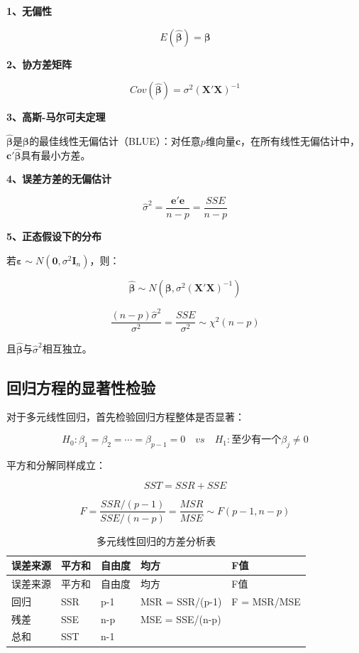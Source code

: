 \documentclass[
]{book}
\begin{document}
\textbf{1、无偏性}

\[
E(\hat{\boldsymbol{\beta}}) = \boldsymbol{\beta}
\]

\textbf{2、协方差矩阵}

\[
Cov(\hat{\boldsymbol{\beta}}) = \sigma^2 (\mathbf{X}'\mathbf{X})^{-1}
\]

\textbf{3、高斯-马尔可夫定理}

\(\hat{\boldsymbol{\beta}}\)是\(\boldsymbol{\beta}\)的最佳线性无偏估计（BLUE）：对任意\(p\)维向量\(\mathbf{c}\)，在所有线性无偏估计中，\(\mathbf{c}'\hat{\boldsymbol{\beta}}\)具有最小方差。

\textbf{4、误差方差的无偏估计}

\[
\hat{\sigma}^2 = \frac{\mathbf{e}'\mathbf{e}}{n-p} = \frac{SSE}{n-p}
\]

\textbf{5、正态假设下的分布}

若\(\boldsymbol{\varepsilon} \sim N(\mathbf{0}, \sigma^2 \mathbf{I}_n)\)，则：

\[
\hat{\boldsymbol{\beta}} \sim N(\boldsymbol{\beta}, \sigma^2 (\mathbf{X}'\mathbf{X})^{-1})
\]

\[
\frac{(n-p)\hat{\sigma}^2}{\sigma^2} = \frac{SSE}{\sigma^2} \sim \chi^2(n-p)
\]

且\(\hat{\boldsymbol{\beta}}\)与\(\hat{\sigma}^2\)相互独立。

\subsection{回归方程的显著性检验}\label{ux56deux5f52ux65b9ux7a0bux7684ux663eux8457ux6027ux68c0ux9a8c}

对于多元线性回归，首先检验回归方程整体是否显著：

\[
H_0: \beta_1 = \beta_2 = \cdots = \beta_{p-1} = 0 \quad vs \quad H_1: \text{至少有一个} \beta_j \neq 0
\]

平方和分解同样成立：

\[
SST = SSR + SSE
\]

\[
F = \frac{SSR / (p-1)}{SSE / (n-p)} = \frac{MSR}{MSE} \sim F(p-1, n-p)
\]

\begin{longtable}[]{@{}lllll@{}}
\caption{多元线性回归的方差分析表}\tabularnewline
\toprule\noalign{}
误差来源 & 平方和 & 自由度 & 均方 & F值 \\
\midrule\noalign{}
\endfirsthead
\toprule\noalign{}
误差来源 & 平方和 & 自由度 & 均方 & F值 \\
\midrule\noalign{}
\endhead
\bottomrule\noalign{}
\endlastfoot
回归 & SSR & p-1 & MSR = SSR/(p-1) & F = MSR/MSE \\
残差 & SSE & n-p & MSE = SSE/(n-p) & \\
总和 & SST & n-1 & & \\
\end{longtable}
\end{document}
